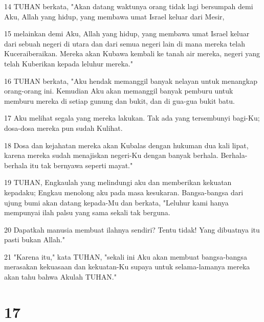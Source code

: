 \par 14 TUHAN berkata, "Akan datang waktunya orang tidak lagi bersumpah demi Aku, Allah yang hidup, yang membawa umat Israel keluar dari Mesir,
\par 15 melainkan demi Aku, Allah yang hidup, yang membawa umat Israel keluar dari sebuah negeri di utara dan dari semua negeri lain di mana mereka telah Kuceraiberaikan. Mereka akan Kubawa kembali ke tanah air mereka, negeri yang telah Kuberikan kepada leluhur mereka."
\par 16 TUHAN berkata, "Aku hendak memanggil banyak nelayan untuk menangkap orang-orang ini. Kemudian Aku akan memanggil banyak pemburu untuk memburu mereka di setiap gunung dan bukit, dan di gua-gua bukit batu.
\par 17 Aku melihat segala yang mereka lakukan. Tak ada yang tersembunyi bagi-Ku; dosa-dosa mereka pun sudah Kulihat.
\par 18 Dosa dan kejahatan mereka akan Kubalas dengan hukuman dua kali lipat, karena mereka sudah menajiskan negeri-Ku dengan banyak berhala. Berhala-berhala itu tak bernyawa seperti mayat."
\par 19 TUHAN, Engkaulah yang melindungi aku dan memberikan kekuatan kepadaku; Engkau menolong aku pada masa kesukaran. Bangsa-bangsa dari ujung bumi akan datang kepada-Mu dan berkata, "Leluhur kami hanya mempunyai ilah palsu yang sama sekali tak berguna.
\par 20 Dapatkah manusia membuat ilahnya sendiri? Tentu tidak! Yang dibuatnya itu pasti bukan Allah."
\par 21 "Karena itu," kata TUHAN, "sekali ini Aku akan membuat bangsa-bangsa merasakan kekuasaan dan kekuatan-Ku supaya untuk selama-lamanya mereka akan tahu bahwa Akulah TUHAN."

\chapter{17}

